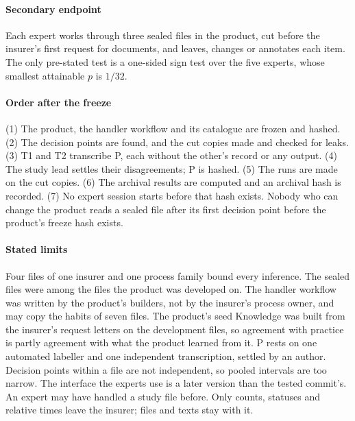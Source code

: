 \paragraph{Secondary endpoint}
Each expert works through three sealed files in the product, cut before the insurer's first request for documents, and leaves, changes or annotates each item. The only pre-stated test is a one-sided sign test over the five experts, whose smallest attainable $p$ is $1/32$.

\paragraph{Order after the freeze}
(1) The product, the handler workflow and its catalogue are frozen and hashed. (2) The decision points are found, and the cut copies made and checked for leaks. (3) T1 and T2 transcribe P, each without the other's record or any output. (4) The study lead settles their disagreements; P is hashed. (5) The runs are made on the cut copies. (6) The archival results are computed and an archival hash is recorded. (7) No expert session starts before that hash exists. Nobody who can change the product reads a sealed file after its first decision point before the product's freeze hash exists.

\paragraph{Stated limits}
Four files of one insurer and one process family bound every inference. The sealed files were among the files the product was developed on. The handler workflow was written by the product's builders, not by the insurer's process owner, and may copy the habits of seven files. The product's seed Knowledge was built from the insurer's request letters on the development files, so agreement with practice is partly agreement with what the product learned from it. P rests on one automated labeller and one independent transcription, settled by an author. Decision points within a file are not independent, so pooled intervals are too narrow. The interface the experts use is a later version than the tested commit's. An expert may have handled a study file before. Only counts, statuses and relative times leave the insurer; files and texts stay with it.
